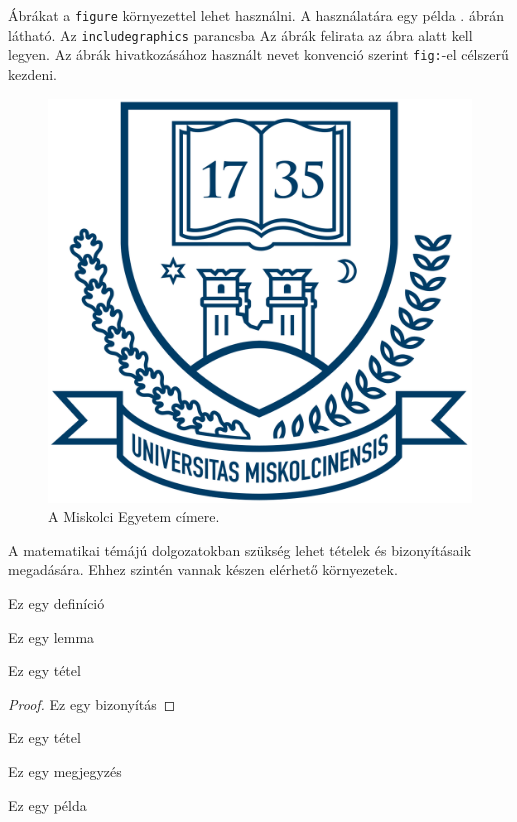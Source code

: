 
Ábrákat a \texttt{figure} környezettel lehet használni.
A használatára egy példa . ábrán látható.
Az \texttt{includegraphics} parancsba 
Az ábrák felirata az ábra alatt kell legyen.
Az ábrák hivatkozásához használt nevet konvenció szerint \texttt{fig:}-el célszerű kezdeni.

\begin{figure}[h]
\centering
\includegraphics[scale=0.3]{images/me_logo.png}
\caption{A Miskolci Egyetem címere.}
\label{fig:cimer}
\end{figure}


A matematikai témájú dolgozatokban szükség lehet tételek és bizonyításaik megadására.
Ehhez szintén vannak készen elérhető környezetek.

\begin{definition}
Ez egy definíció
\end{definition}

\begin{lemma}
Ez egy lemma
\end{lemma}

\begin{theorem}
Ez egy tétel
\end{theorem}

\begin{proof}
Ez egy bizonyítás
\end{proof}

\begin{corollary}
Ez egy tétel
\end{corollary}

\begin{remark}
Ez egy megjegyzés
\end{remark}

\begin{example}
Ez egy példa
\end{example}

